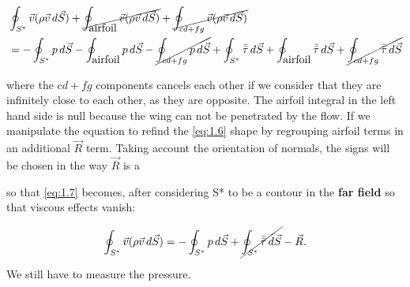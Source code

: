 		\begin{equation}
		\begin{aligned}
		&\oint _{S^*} \vec{v} (\rho \vec{v} \, d\vec{S})  + \cancel{\oint _{\mbox{airfoil}} \vec{v} (\rho \vec{v} \, d\vec{S})} + \cancel{\oint _{cd+fg} \vec{v} (\rho \vec{v} \, d\vec{S})} 
		\\&= -\oint _{S^*} p \, d\vec{S} -\oint _{\mbox{airfoil}} p \, d\vec{S}-\cancel{\oint _{cd + fg} p \, d\vec{S}}+ \oint _{S^*} \bar{\bar{\tau}} \, d\vec{S} +\oint _{\mbox{airfoil}} \bar{\bar{\tau}}\, d\vec{S} +\cancel{\oint _{cd + fg} \bar{\bar{\tau}}\, d\vec{S}}
		\end{aligned}
		\label{eq:1.7}
		\end{equation}
		
		where the $cd + fg$ components cancels each other if we consider that they are infinitely close to each other, as they are opposite. The airfoil integral in the left hand side is null because the wing can not be penetrated by the flow. If we manipulate the equation to refind the \eqref{eq:1.6} shape by regrouping airfoil terms in an additional $\vec{R}$ term. Taking account the orientation of normals, the signs will be chosen in the way $\vec{R}$ is a
		
		\begin{center}
		\end{center}
		
		so that \eqref{eq:1.7} becomes, after considering S* to be a contour in the \textbf{far field} so that viscous effects vanish:
		
		\begin{equation}
		\oint _{S^*} \vec{v} (\rho \vec{v} \, d\vec{S}) = -\oint _{S^*} p \, d\vec{S} + \cancel{\oint _{S^*} \bar{\bar{\tau}} \, d\vec{S}} - \vec{R}.
		\label{eq:1.9}
		\end{equation}
		
		We still have to measure the pressure.
		
